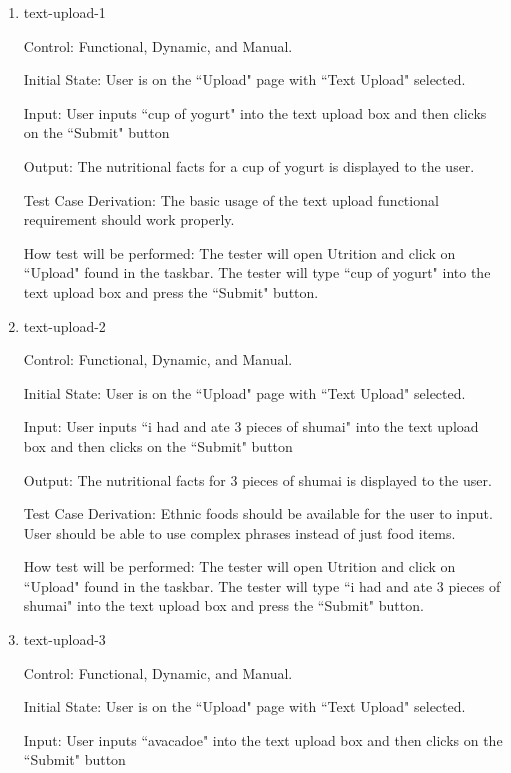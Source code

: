 \documentclass[12pt, titlepage]{article}
\begin{document}
	\begin{enumerate}
	\item{text-upload-1\\}
	
	Control: Functional, Dynamic, and Manual.
	
	Initial State: User is on the ``Upload" page with ``Text Upload" selected.
	
	Input: User inputs ``cup of yogurt" into the text upload box and then clicks on the ``Submit" button
	
	Output: The nutritional facts for a cup of yogurt is displayed to the user.
	
	Test Case Derivation: The basic usage of the text upload functional requirement should work properly.
	
	How test will be performed: The tester will open Utrition and click on ``Upload" found in the taskbar. The tester will type ``cup of yogurt" into the text upload box and press the ``Submit" button.
	
	\item{text-upload-2\\}
	
	Control: Functional, Dynamic, and Manual.
	
	Initial State: User is on the ``Upload" page with ``Text Upload" selected.
	
	Input: User inputs ``i had and ate 3 pieces of shumai" into the text upload box and then clicks on the ``Submit" button
	
	Output: The nutritional facts for 3 pieces of shumai is displayed to the user.
	
	Test Case Derivation: Ethnic foods should be available for the user to input. User should be able to use complex phrases instead of just food items.
	
	How test will be performed: The tester will open Utrition and click on ``Upload" found in the taskbar. The tester will type ``i had and ate 3 pieces of shumai" into the text upload box and press the ``Submit" button.
	
	\item{text-upload-3\\}
	
	Control: Functional, Dynamic, and Manual.
	
	Initial State: User is on the ``Upload" page with ``Text Upload" selected.
	
	Input: User inputs ``avacadoe" into the text upload box and then clicks on the ``Submit" button
	

\end{enumerate}
\end{document}
